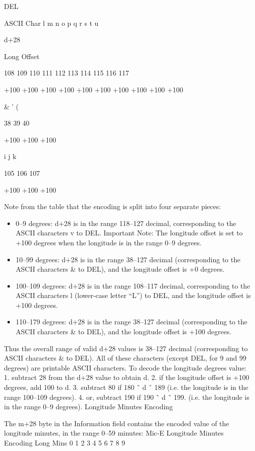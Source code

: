 {{{{DEL

ASCII
Char
l
m
n
o
p
q
r
s
t
u

d+28

Long
Offset

108
109
110
111
112
113
114
115
116
117

+100
+100
+100
+100
+100
+100
+100
+100
+100
+100

&
'
(

38
39
40

+100
+100
+100

i
j
k

105
106
107

+100
+100
+100


Note from the table that the encoding is split into four separate pieces:

\begin{itemize}
\item 0–9 degrees: d+28 is in the range 118–127 decimal, corresponding to
the ASCII characters v to DEL.
Important Note: The longitude offset is set to +100 degrees when
the longitude is in the range 0–9 degrees.

\item 10–99 degrees: d+28 is in the range 38–127 decimal (corresponding
to the ASCII characters & to DEL), and the longitude offset is +0
degrees.

\item 100–109 degrees: d+28 is in the range 108–117 decimal,
corresponding to the ASCII characters l (lower-case letter “L”) to
DEL, and the longitude offset is +100 degrees.

\item 110–179 degrees: d+28 is in the range 38–127 decimal
(corresponding to the ASCII characters & to DEL), and the longitude
offset is +100 degrees.


\end{itemize}

Thus the overall range of valid d+28 values is 38–127 decimal
(corresponding to ASCII characters & to DEL).
All of these characters (except DEL, for 9 and 99 degrees) are printable
ASCII characters.
To decode the longitude degrees value:
1. subtract 28 from the d+28 value to obtain d.
2. if the longitude offset is +100 degrees, add 100 to d.
3. subtract 80 if 180 ˜ d ˜ 189
(i.e. the longitude is in the range 100–109 degrees).
4. or, subtract 190 if 190 ˜ d ˜ 199.
(i.e. the longitude is in the range 0–9 degrees).
Longitude Minutes
Encoding

The m+28 byte in the Information field contains the encoded value of the
longitude minutes, in the range 0–59 minutes:
Mic-E Longitude Minutes Encoding
Long
Mins
0
1
2
3
4
5
6
7
8
9

}}}}
